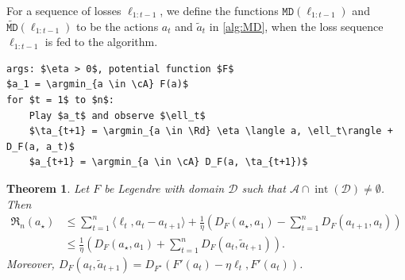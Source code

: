 \documentclass{article}
\theoremstyle{plain}
\newtheorem{theorem}{Theorem}
\theoremstyle{definition}
\newcommand{\Rd}{\mathbb{R}^d}
\newcommand{\argmin}{\operatornamewithlimits{arg\,min}}
\newcommand{\Reg}{\mathfrak{R}}
\newcommand{\cA}{\mathcal A}
\newcommand{\cD}{\mathcal D}
\newcommand{\interior}{\operatorname{int}}
\newcommand{\ta}{\tilde{a}}
\newcommand{\fmd}{\texttt{MD}}
\newcommand{\tfmd}{\widetilde{\texttt{MD}}}
\newcommand{\mdalg}{\textsf{MD}\xspace}
\begin{document}
For a sequence of losses $\ell_{1:t-1}$, we define the functions $\fmd(\ell_{1:t-1})$
and $\tfmd(\ell_{1:t-1})$ to be the actions $a_t$ and $\ta_t$
in \cref{alg:MD}, when the loss sequence $\ell_{1:t-1}$ is fed to the algorithm.
\begin{algorithm}[h!]
    \begin{minipage}{12cm}
        \begin{mdframed}
            \begin{lstlisting}
args: $\eta > 0$, potential function $F$
$a_1 = \argmin_{a \in \cA} F(a)$
for $t = 1$ to $n$:
    Play $a_t$ and observe $\ell_t$
    $\ta_{t+1} = \argmin_{a \in \Rd} \eta \langle a, \ell_t\rangle + D_F(a, a_t)$
    $a_{t+1} = \argmin_{a \in \cA} D_F(a, \ta_{t+1})$
\end{lstlisting}
            \caption{\mdalg---
                It also holds that $a_{t+1} = \argmin_{a \in \cA} \eta \langle a, \ell_t\rangle + D_F(a, a_t)$.
            }\label{alg:MD}
        \end{mdframed}
    \end{minipage}
\end{algorithm}
\begin{theorem}\label{thm:MD}
    Let $F$ be Legendre with domain $\cD$ such that $\cA \cap \interior(\cD)\neq \emptyset$.
    Then
    \begin{align*}
        \Reg_n(a_\star)
         & \leq
        \sum_{t=1}^{n} \langle \ell_t, a_t - a_{t+1} \rangle
        + \frac{1}{\eta}
        \left(
        D_F(a_\star, a_1) -
        \sum_{t=1}^{n} D_F(a_{t+1}, a_t)
        \right) \\
         & \leq
        \frac{1}{\eta}
        \left(
        D_F(a_\star, a_1) + \sum_{t=1}^{n} D_F(a_{t}, \tilde{a}_{t+1})
        \right).
    \end{align*}
    Moreover,
    $ D_F(a_{t}, \tilde{a}_{t+1})
        = D_{F^\star}\left(F'(a_t) - \eta \ell_t, F'(a_t)\right)$.
\end{theorem}
\end{document}
